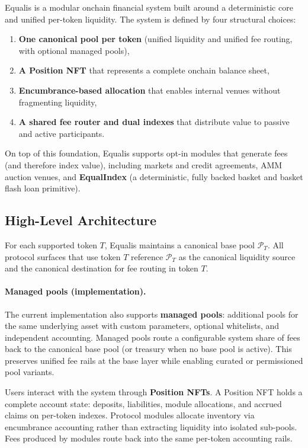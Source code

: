 \documentclass[version=preprint]{iacrcc}
\begin{document}
Equalis is a modular onchain financial system built around a deterministic core and unified per-token liquidity. The system is defined by four structural choices:
\begin{enumerate}
  \item \textbf{One canonical pool per token} (unified liquidity and unified fee routing, with optional managed pools),
  \item \textbf{A Position NFT} that represents a complete onchain balance sheet,
  \item \textbf{Encumbrance-based allocation} that enables internal venues without fragmenting liquidity,
  \item \textbf{A shared fee router and dual indexes} that distribute value to passive and active participants.
\end{enumerate}
On top of this foundation, Equalis supports opt-in modules that generate fees (and therefore index value), including markets and credit agreements, AMM auction venues, and \textbf{EqualIndex} (a deterministic, fully backed basket and basket flash loan primitive).

\subsection{High-Level Architecture}

For each supported token $T$, Equalis maintains a canonical base pool $\mathcal{P}_T$. All protocol surfaces that use token $T$ reference $\mathcal{P}_T$ as the canonical liquidity source and the canonical destination for fee routing in token $T$.

\paragraph{Managed pools (implementation).}
The current implementation also supports \textbf{managed pools}: additional pools for the same underlying asset with custom parameters, optional whitelists, and independent accounting. Managed pools route a configurable system share of fees back to the canonical base pool (or treasury when no base pool is active). This preserves unified fee rails at the base layer while enabling curated or permissioned pool variants.

Users interact with the system through \textbf{Position NFTs}. A Position NFT holds a complete account state: deposits, liabilities, module allocations, and accrued claims on per-token indexes. Protocol modules allocate inventory via encumbrance accounting rather than extracting liquidity into isolated sub-pools. Fees produced by modules route back into the same per-token accounting rails.
\end{document}
